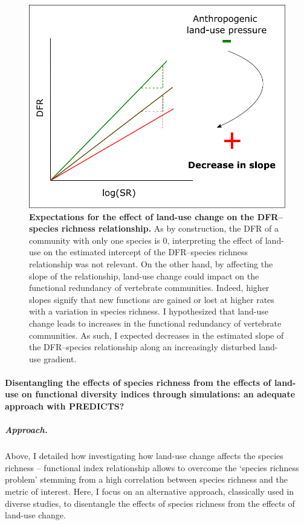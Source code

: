 \begin{figure}[h!]
\centering
\includegraphics[scale=0.6]{figures/chapter3/DFR/DFRchart}
\caption[Expectations for the effect of land-use change on the DFR--species richness relationship]{\textbf{Expectations for the effect of land-use change on the DFR--species richness relationship.} As by construction, the DFR of a community with only one species is 0, interpreting the effect of land-use on the estimated intercept of the DFR--species richness relationship was not relevant. On the other hand, by affecting the slope of the relationship, land-use change could impact on the functional redundancy of vertebrate communities. Indeed, higher slopes signify that new functions are gained or lost at higher rates with a variation in species richness. I hypothesized that land-use change leads to increases in the functional redundancy of vertebrate communities. As such, I expected decreases in the estimated slope of the DFR--species relationship along an increasingly disturbed land-use gradient.}
\label{DFRchart}
\end{figure}

\paragraph{Disentangling the effects of species richness from the effects of land-use on functional diversity indices through simulations: an adequate approach with PREDICTS?}

\subparagraph{Approach.}
Above, I detailed how investigating how land-use change affects the species richness -- functional index relationship allows to overcome the `species richness problem' stemming from a high correlation between species richness and the metric of interest. Here, I focus on an alternative approach, classically used in diverse studies, to disentangle the effects of species richness from the effects of land-use change.


